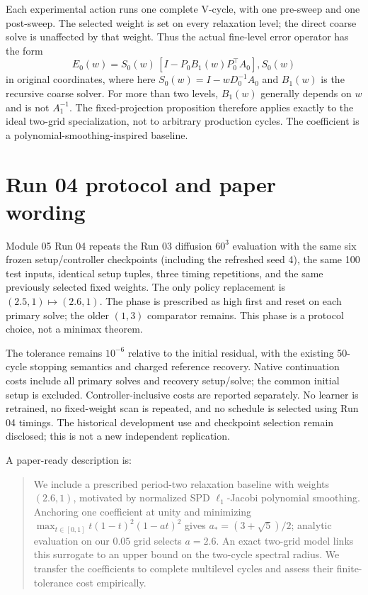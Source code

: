 \documentclass[11pt]{article}
\begin{document}
Each experimental action runs one complete V-cycle, with one pre-sweep
and one post-sweep. The selected weight is set on every relaxation level;
the direct coarse solve is unaffected by that weight. Thus the actual
fine-level error operator has the form
\[
 E_0(w)=S_0(w)\,[I-P_0 B_1(w)P_0^\top A_0],S_0(w)
\]
in original coordinates, where here
$S_0(w)=I-wD_0^{-1}A_0$ and $B_1(w)$ is the recursive coarse solver.
For more than two levels, $B_1(w)$ generally depends on $w$ and is not
$A_1^{-1}$. The fixed-projection proposition therefore applies exactly
to the ideal two-grid specialization, not to arbitrary production cycles.
The coefficient is a polynomial-smoothing-inspired baseline.

\section{Run 04 protocol and paper wording}
Module 05 Run 04 repeats the Run 03 diffusion $60^3$ evaluation with the
same six frozen setup/controller checkpoints (including the refreshed
seed 4), the same 100 test inputs, identical setup tuples, three timing
repetitions, and the same previously selected fixed weights. The only
policy replacement is $(2.5,1)\mapsto(2.6,1)$. The phase is prescribed as
high first and reset on each primary solve; the older $(1,3)$ comparator
remains. This phase is a protocol choice, not a minimax theorem.

The tolerance remains $10^{-6}$ relative to the initial residual, with
the existing 50-cycle stopping semantics and charged reference recovery.
Native continuation costs include all primary solves and recovery
setup/solve; the common initial setup is excluded. Controller-inclusive
costs are reported separately. No learner is retrained, no fixed-weight
scan is repeated, and no schedule is selected using Run 04 timings.
The historical development use and checkpoint selection remain disclosed;
this is not a new independent replication.

A paper-ready description is:
\begin{quote}
We include a prescribed period-two relaxation baseline with weights
$(2.6,1)$, motivated by normalized SPD $\ell_1$-Jacobi polynomial smoothing.
Anchoring one coefficient at unity and minimizing
$\max_{t\in[0,1]}t(1-t)^2(1-at)^2$ gives
$a_*=(3+\sqrt5)/2$; analytic evaluation on our $0.05$ grid selects $a=2.6$.
An exact two-grid model links this surrogate to an upper bound on the
two-cycle spectral radius. We transfer the coefficients to complete
multilevel cycles and assess their finite-tolerance cost empirically.
\end{quote}
\end{document}
